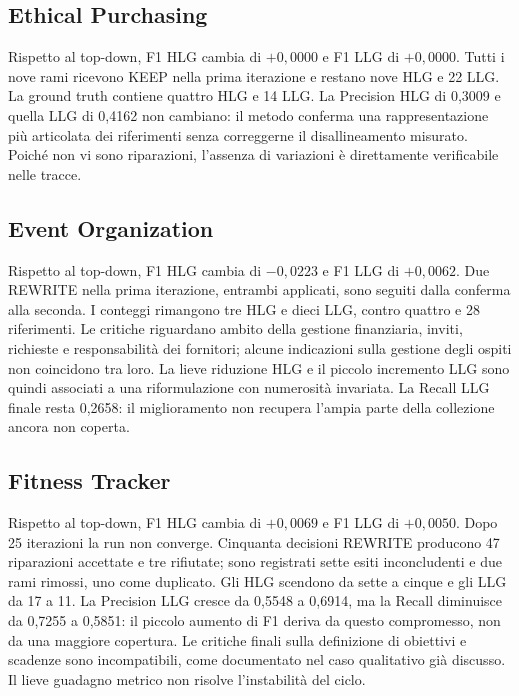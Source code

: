 \subsection{Ethical Purchasing}
Rispetto al top-down, F1 HLG cambia di $+0,0000$ e F1 LLG di $+0,0000$. Tutti i nove rami ricevono KEEP nella prima iterazione e restano nove HLG e 22 LLG. La ground truth contiene quattro HLG e 14 LLG. La Precision HLG di 0,3009 e quella LLG di 0,4162 non cambiano: il metodo conferma una rappresentazione più articolata dei riferimenti senza correggerne il disallineamento misurato. Poiché non vi sono riparazioni, l'assenza di variazioni è direttamente verificabile nelle tracce.

\subsection{Event Organization}
Rispetto al top-down, F1 HLG cambia di $-0,0223$ e F1 LLG di $+0,0062$. Due REWRITE nella prima iterazione, entrambi applicati, sono seguiti dalla conferma alla seconda. I conteggi rimangono tre HLG e dieci LLG, contro quattro e 28 riferimenti. Le critiche riguardano ambito della gestione finanziaria, inviti, richieste e responsabilità dei fornitori; alcune indicazioni sulla gestione degli ospiti non coincidono tra loro. La lieve riduzione HLG e il piccolo incremento LLG sono quindi associati a una riformulazione con numerosità invariata. La Recall LLG finale resta 0,2658: il miglioramento non recupera l'ampia parte della collezione ancora non coperta.

\subsection{Fitness Tracker}
Rispetto al top-down, F1 HLG cambia di $+0,0069$ e F1 LLG di $+0,0050$. Dopo 25 iterazioni la run non converge. Cinquanta decisioni REWRITE producono 47 riparazioni accettate e tre rifiutate; sono registrati sette esiti inconcludenti e due rami rimossi, uno come duplicato. Gli HLG scendono da sette a cinque e gli LLG da 17 a 11. La Precision LLG cresce da 0,5548 a 0,6914, ma la Recall diminuisce da 0,7255 a 0,5851: il piccolo aumento di F1 deriva da questo compromesso, non da una maggiore copertura. Le critiche finali sulla definizione di obiettivi e scadenze sono incompatibili, come documentato nel caso qualitativo già discusso. Il lieve guadagno metrico non risolve l'instabilità del ciclo.

